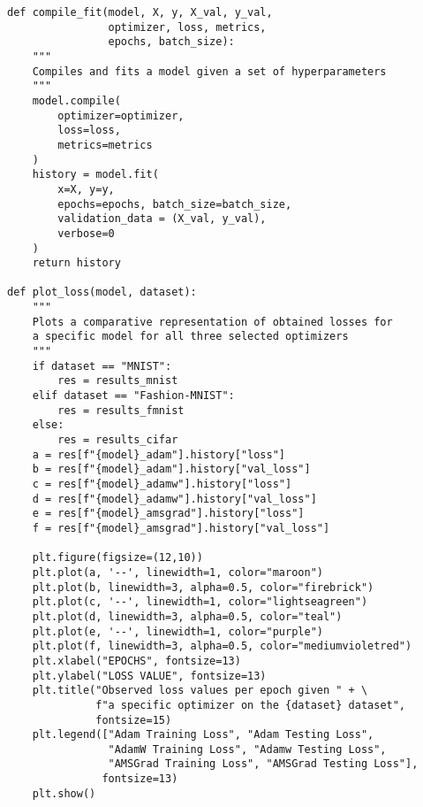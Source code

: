 \documentclass{article} %
\begin{document}
\begin{lstlisting}
def compile_fit(model, X, y, X_val, y_val,
                optimizer, loss, metrics,
                epochs, batch_size):
    """
    Compiles and fits a model given a set of hyperparameters
    """
    model.compile(
        optimizer=optimizer,
        loss=loss,
        metrics=metrics
    )
    history = model.fit(
        x=X, y=y,
        epochs=epochs, batch_size=batch_size,
        validation_data = (X_val, y_val),
        verbose=0
    )
    return history
    
def plot_loss(model, dataset):
    """
    Plots a comparative representation of obtained losses for
    a specific model for all three selected optimizers
    """
    if dataset == "MNIST":
        res = results_mnist
    elif dataset == "Fashion-MNIST":
        res = results_fmnist
    else:
        res = results_cifar
    a = res[f"{model}_adam"].history["loss"]
    b = res[f"{model}_adam"].history["val_loss"]
    c = res[f"{model}_adamw"].history["loss"]
    d = res[f"{model}_adamw"].history["val_loss"]
    e = res[f"{model}_amsgrad"].history["loss"]
    f = res[f"{model}_amsgrad"].history["val_loss"]

    plt.figure(figsize=(12,10))
    plt.plot(a, '--', linewidth=1, color="maroon")
    plt.plot(b, linewidth=3, alpha=0.5, color="firebrick")
    plt.plot(c, '--', linewidth=1, color="lightseagreen")
    plt.plot(d, linewidth=3, alpha=0.5, color="teal")
    plt.plot(e, '--', linewidth=1, color="purple")
    plt.plot(f, linewidth=3, alpha=0.5, color="mediumvioletred")
    plt.xlabel("EPOCHS", fontsize=13)
    plt.ylabel("LOSS VALUE", fontsize=13)
    plt.title("Observed loss values per epoch given " + \
              f"a specific optimizer on the {dataset} dataset",
              fontsize=15)
    plt.legend(["Adam Training Loss", "Adam Testing Loss",
                "AdamW Training Loss", "Adamw Testing Loss",
                "AMSGrad Training Loss", "AMSGrad Testing Loss"],
               fontsize=13)
    plt.show()
\end{lstlisting}
\end{document}
